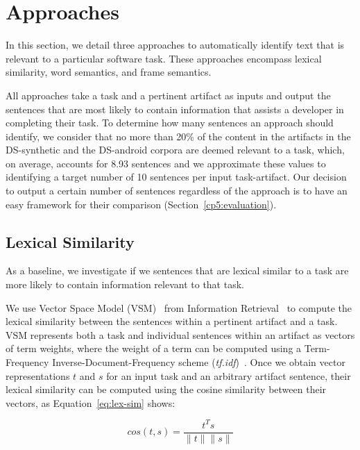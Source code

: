 \section{Approaches}
\label{cp5:approaches}

In this section, we detail three approaches to automatically identify text that is relevant to a particular software task.
These approaches encompass lexical similarity, word semantics, and frame semantics.



All approaches take a task and a pertinent artifact as inputs and output the sentences 
that are most likely to contain information that assists a developer in completing their task. 
To determine how many sentences an approach should identify, we consider that 
no more than 20\% of the content in the artifacts in the
 \acs{DS-synthetic} and the \acs{DS-android} corpora are deemed relevant to a task, which, on average, accounts for 8.93 sentences
 and we approximate these values to identifying a target number of 10 sentences per input task-artifact. 
Our decision to output a certain number of sentences regardless of the approach is to have an easy framework for their comparison (Section~\ref{cp5:evaluation}).



\subsection{Lexical Similarity}

As a baseline, we investigate if we sentences that are lexical similar
to a task are more likely to contain information relevant to that task.


We use Vector Space Model (VSM)~\cite{Salton1975vsm} from Information Retrieval~\cite{Manning2009IR}
to compute the lexical similarity between the sentences within a pertinent artifact and a task. 
VSM represents both a task and individual sentences within an artifact as vectors of term weights,
where the weight of a term
can be computed using a Term-Frequency Inverse-Document-Frequency scheme (\textit{tf.idf})~\cite{Manning2009IR}. 
Once we obtain vector representations $t$ and $s$ 
for an input task and an arbitrary artifact sentence, 
their lexical similarity can be computed 
using the cosine similarity between their vectors, as Equation~\ref{eq:lex-sim} shows:



\begin{equation}
    cos(t,s) = \frac{t^Ts}{\|t\| \|s\|}
    \label{eq:lex-sim}
\end{equation}
\smallskip

